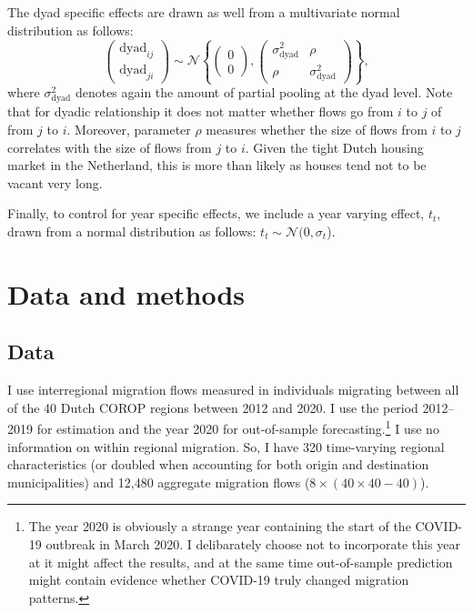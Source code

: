 \documentclass[11pt,parskip,abstracton,notitlepage, dvipsnames]{scrartcl}
\begin{document}
The dyad specific effects are drawn as well from a multivariate normal distribution as follows: 
 \begin{equation}
	\begin{pmatrix}\text{dyad}_{ij}\\
		\text{dyad}_{ji}
	\end{pmatrix} \sim \mathcal{N} \left\{\left(\begin{array}{c}
	0\\
	0
       \end{array}\right),
\left(                                        
\begin{array}{cc}
  \sigma^2_{\text{dyad}} & \rho \\
  \rho & \sigma^2_{\text{dyad}} 
\end{array}
\right)
\right\},
\end{equation}
where $\sigma^2_{\text{dyad}}$ denotes again the amount of partial pooling at
the dyad level. Note that for dyadic relationship it does not matter whether
flows go from $i$ to $j$ of from $j$ to $i$. Moreover, parameter $\rho$ measures
whether the size of flows from $i$ to $j$ correlates with the size of flows from
$j$ to $i$. Given the tight Dutch housing market in the Netherland, this is more than likely as houses tend not to be vacant very long.

Finally, to control for year specific effects, we include a year varying effect, $t_t$, drawn from a normal distribution as follows: $t_t \sim \mathcal{N}(0, \sigma_t$). 

\section{Data and methods}

\subsection{Data}

I use interregional migration flows measured in individuals migrating between
all of the 40 Dutch COROP regions between 2012 and 2020. I use the period
2012--2019 for estimation and the year 2020 for out-of-sample
forecasting.\footnote{The year 2020 is obviously a strange year containing the
  start of the COVID-19 outbreak in March 2020. I delibarately choose not to
  incorporate this year at it might affect the results, and at the same time
  out-of-sample prediction might contain evidence whether COVID-19 truly changed
  migration patterns.} I use no information on within regional migration. So, I
have 320 time-varying regional characteristics (or doubled when accounting for
both origin and destination municipalities) and 12,480 aggregate migration flows
($8 \times (40 \times 40 - 40)$).
\end{document}
